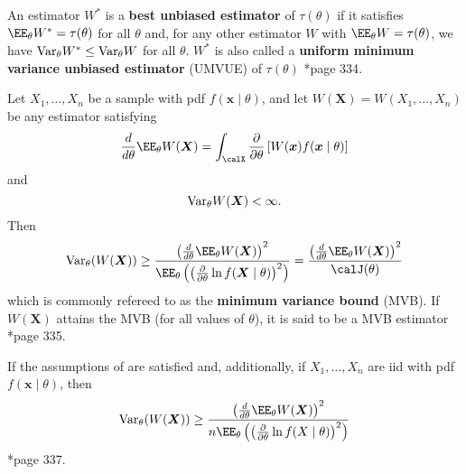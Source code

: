 \begin{defe} \label{defe: umvu}
    An estimator $W^{\ast}$ is a {\bf best unbiased estimator} of $\tau (\theta)$ if it satisfies $\EE_{\theta} W^{\ast} = \tau (\theta)$ for all $\theta$ and, for any other estimator $W$ with $\EE_{\theta} W = \tau (\theta)$, we have ${\operatorname{Var}}_{\theta} W^{\ast} \leq {\operatorname{Var}}_{\theta} W$ for all $\theta$. $W^{\ast}$ is also called a {\bf uniform minimum variance unbiased estimator} (UMVUE) of $\tau (\theta)$ \cite{CasellaGeorge2001SI}*{page 334}.
\end{defe}

\begin{thm} \label{thm: cri_neq}
    Let $X_1 , \ldots , X_n$ be a sample with pdf $f(\bm{x} \mid \theta)$, and let $W(\bm{X}) = W(X_1 , \ldots , X_n)$ be any estimator satisfying
    \begin{equation*}
        \frac{d}{d \theta} \EE_{\theta} W(\bm{X}) = \int_{\calX} \frac{\partial}{\partial \theta} \left[ W(\bm{x}) f(\bm{x} \mid \theta) \right]
    \end{equation*}
    and
    \begin{equation*}
        {\operatorname{Var}}_{\theta} W(\bm{X}) < \infty.
    \end{equation*}
    Then
    \begin{equation*}
        \Var_{\theta} (W(\bm{X})) \geq \frac{\left( \frac{d}{d \theta} \EE_{\theta} W(\bm{X}) \right)^2}{\EE_{\theta} \left( \left( \frac{\partial}{\partial \theta} \ln f(\bm{X} \mid \theta)  \right)^2 \right)} = \frac{\left( \frac{d}{d \theta} \EE_{\theta} W(\bm{X}) \right)^2}{\calJ (\theta)}
    \end{equation*}
    which is commonly refereed to as the {\bf minimum variance bound} (MVB). If $W(\bm{X})$ attains the MVB (for all values of $\theta$), it is said to be a MVB estimator \cite{CasellaGeorge2001SI}*{page 335}.
\end{thm}

\begin{cor} \label{cor: cri_neq_iid}
    If the assumptions of  are satisfied and, additionally, if $X_1 , \ldots , X_n$ are iid with pdf $f(\bm{x} \mid \theta)$, then
    \begin{equation*}
        \Var_{\theta} (W(\bm{X})) \geq \frac{\left( \frac{d}{d \theta} \EE_{\theta} W(\bm{X}) \right)^2}{n \EE_{\theta} \left( \left( \frac{\partial}{\partial \theta} \ln f(X \mid \theta)  \right)^2 \right)}
    \end{equation*}
    \cite{CasellaGeorge2001SI}*{page 337}.
\end{cor}

